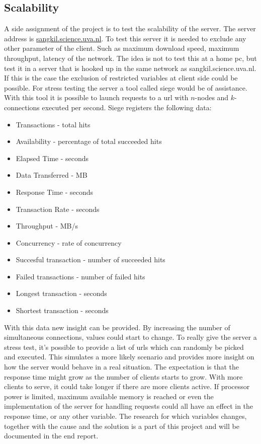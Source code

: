 \subsection{Scalability}
A side assignment of the project is to test the scalability of the server. The server address is \url{sangkil.science.uva.nl}. To test this server it is needed to exclude any other parameter of the client. Such as maximum download speed, maximum throughput, latency of the network. The idea is not to test this at a home pc, but test it in a server that is hooked up in the same network as sangkil.science.uva.nl. If this is the case the exclusion of restricted variables at client side could be possible. 
For stress testing the server a tool called siege \cite{Siege} would be of assistance. With this tool it is possible to launch requests to a url with $n$-nodes and $k$-connections executed per second. Siege registers the following data:
\begin{itemize}
\item Transactions - total hits
\item Availability - percentage of total succeeded hits
\item Elapsed Time - seconds
\item Data Transferred - MB
\item Response Time - seconds
\item Transaction Rate - seconds 
\item Throughput - MB/s
\item Concurrency - rate of concurrency
\item Succesful transaction - number of succeeded hits
\item Failed transactions - number of failed hits
\item Longest transaction - seconds
\item Shortest transaction - seconds
\end{itemize}
With this data new insight can be provided. By increasing the number of simultaneous connections, values could start to change. To really give the server a stress test, it's possible to provide a list of urls which can randomly be picked and executed. This simulates a more likely scenario and provides more insight on how the server would behave in a real situation. The expectation is that the response time might grow as the number of clients starts to grow. With more clients to serve, it could take longer if there are more clients active. If processor power is limited, maximum available memory is reached or even the implementation of the server for handling requests could all have an effect in the response time, or any other variable. The research for which variables changes, together with the cause and the solution is a part of this project and will be documented in the end report. 

